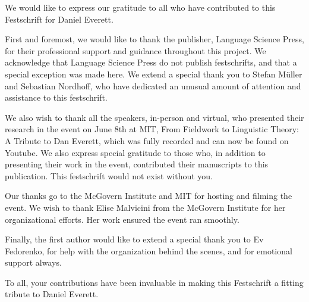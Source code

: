 \addchap{\lsAcknowledgementTitle} 

We would like to express our gratitude to all who have contributed to this Festschrift for Daniel Everett. 

First and foremost, we would like to thank the publisher, Language Science Press, for their professional support and guidance throughout this project. We acknowledge that Language Science Press do not publish festschrifts, and that a special exception was made here. We extend a special thank you to Stefan Müller and Sebastian Nordhoff, who have dedicated an unusual amount of attention and assistance to this festschrift. 

We also wish to thank all the speakers, in-person and virtual, who presented their research in the event on June 8th at MIT, From Fieldwork to Linguistic Theory: A Tribute to Dan Everett, which was fully recorded and can now be found on Youtube. We also express special gratitude to those who, in addition to presenting their work in the event, contributed their manuscripts to this publication. This festschrift would not exist without you. 

Our thanks go to the McGovern Institute and MIT for hosting and filming the event. We wish to thank Elise Malvicini from the McGovern Institute for her organizational efforts. Her work ensured the event ran smoothly. 

Finally, the first author would like to extend a special thank you to Ev Fedorenko, for help with the organization behind the scenes, and for emotional support always.

To all, your contributions have been invaluable in making this Festschrift a fitting tribute to Daniel Everett.
